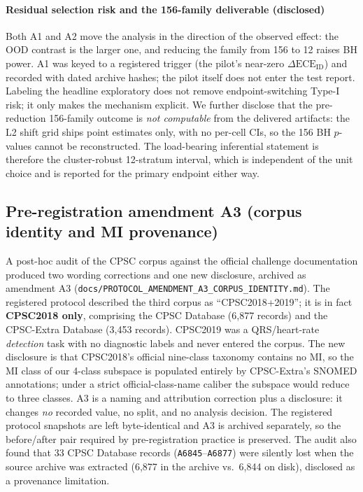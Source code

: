 \documentclass[final,5p,times,nonatbib]{elsarticle}
\begin{document}
\paragraph{Residual selection risk and the 156-family deliverable
(disclosed)} Both A1 and A2 move the analysis in the direction of the
observed effect: the OOD contrast is the larger one, and reducing the
family from 156 to 12 raises BH power. A1 was keyed to a registered
trigger (the pilot's near-zero $\Delta\text{ECE}_{\text{ID}}$) and
recorded with dated archive hashes; the pilot itself does not enter the
test report. Labeling the headline exploratory does not remove
endpoint-switching Type-I risk; it only makes the mechanism explicit.
We further disclose that the pre-reduction 156-family outcome is
\emph{not computable} from the delivered artifacts: the L2 shift grid
ships point estimates only, with no per-cell CIs, so the 156 BH
$p$-values cannot be reconstructed. The load-bearing inferential
statement is therefore the cluster-robust 12-stratum interval, which is
independent of the unit choice and is reported for the primary endpoint
either way.

\subsection{Pre-registration amendment A3 (corpus identity and MI provenance)}
\label{sec:a3}
A post-hoc audit of the CPSC corpus against the official challenge
documentation produced two wording corrections and one new disclosure,
archived as amendment A3
(\texttt{docs/PROTOCOL\_AMENDMENT\_A3\_}\allowbreak\texttt{CORPUS\_IDENTITY.md}).
The registered protocol described the third corpus as
``CPSC2018+2019''; it is in fact \textbf{CPSC2018 only}, comprising the
CPSC Database (6,877 records) and the CPSC-Extra Database (3,453
records). CPSC2019 was a QRS/heart-rate \emph{detection} task with no
diagnostic labels and never entered the corpus. The new disclosure is
that CPSC2018's official nine-class taxonomy contains no MI, so the MI
class of our 4-class subspace is populated entirely by CPSC-Extra's
SNOMED annotations; under a strict official-class-name caliber the
subspace would reduce to three classes. A3 is a naming and attribution
correction plus a disclosure: it changes \emph{no} recorded value, no
split, and no analysis decision. The registered protocol snapshots are
left byte-identical and A3 is archived separately, so the
before/after pair required by pre-registration practice is preserved.
The audit also found that 33 CPSC Database records
(\texttt{A6845}--\texttt{A6877}) were silently lost when the source
archive was extracted (6,877 in the archive vs.\ 6,844 on disk),
disclosed as a provenance limitation.
\end{document}
